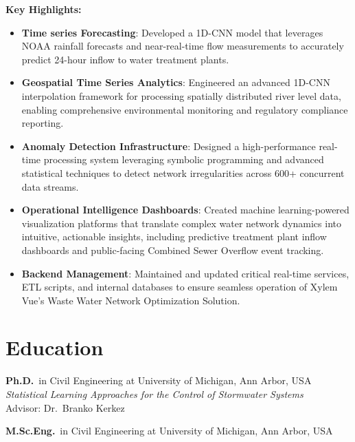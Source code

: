 \documentclass[a4paper,11pt]{article}
\newcommand{\years}[1]{%
  {\reversemarginpar\strut\marginnote{{\small#1}}}%
}
\begin{document}
\vspace{2mm}
{\small \textbf{Key Highlights:}}
\vspace{-2mm}
\begin{itemize}
	\setlength\itemsep{1mm}
	\item \textbf{Time series Forecasting}: Developed a 1D-CNN model that leverages NOAA rainfall forecasts and near-real-time flow measurements to accurately predict 24-hour inflow to water treatment plants.
	\item \textbf{Geospatial Time Series Analytics}: Engineered an advanced 1D-CNN interpolation framework for processing spatially distributed river level data, enabling comprehensive environmental monitoring and regulatory compliance reporting.
	\item \textbf{Anomaly Detection Infrastructure}: Designed a high-performance real-time processing system leveraging symbolic programming and advanced statistical techniques to detect network irregularities across 600+ concurrent data streams.
	\item \textbf{Operational Intelligence Dashboards}: Created machine learning-powered visualization platforms that translate complex water network dynamics into intuitive, actionable insights, including predictive treatment plant inflow dashboards and public-facing Combined Sewer Overflow event tracking.
	\item \textbf{Backend Management}: Maintained and updated critical real-time services, ETL scripts, and internal databases to ensure seamless operation of Xylem Vue's Waste Water Network Optimization Solution.
\end{itemize}

\section*{Education}

\years{2017--2020}%
\textbf{Ph.D.}\ in Civil Engineering at University of Michigan, Ann Arbor, USA\\[.1cm]
\noindent \emph{Statistical Learning Approaches for the Control of Stormwater Systems}\\
Advisor: Dr.\ Branko Kerkez\\[.1cm]

\years{2015--2017}%
\textbf{M.Sc.Eng.}\ in Civil Engineering at University of Michigan, Ann Arbor, USA\\[.1cm]
\end{document}

